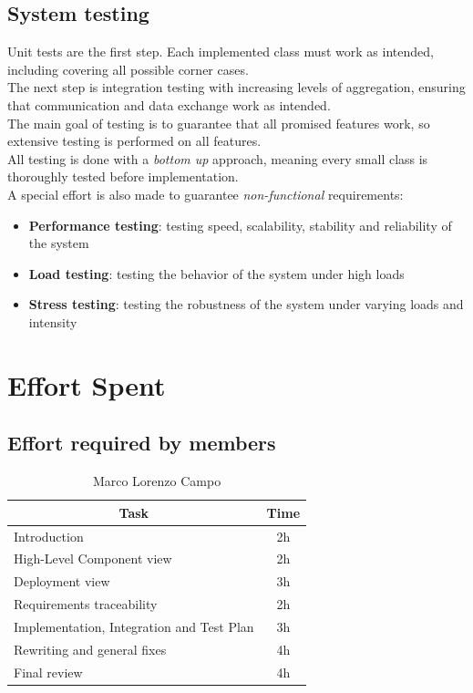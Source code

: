 \documentclass[12pt]{report}
\begin{document}
\section{System testing}
Unit tests are the first step. Each implemented class must work as intended, including covering all possible corner cases.\\
The next step is integration testing with increasing levels of aggregation, ensuring that communication and data exchange work as intended.\\
The main goal of testing is to guarantee that all promised features work, so extensive testing is performed on all features.\\
All testing is done with a \emph{bottom up} approach, meaning every small class is thoroughly tested before implementation.\\
A special effort is also made to guarantee \emph{non-functional} requirements:
\begin{itemize}
    \item\textbf{Performance testing}: testing speed, scalability, stability and reliability of the system
    \item\textbf{Load testing}: testing the behavior of the system under high loads
    \item\textbf{Stress testing}: testing the robustness of the system under
    varying loads and intensity
\end{itemize}

\chapter{Effort Spent}

\section{Effort required by members}
\begin{table}[h]
\centering
\begin{tabular}{|l|c|}
\hline
\multicolumn{1}{|c|}{Task}      & Time \\ \hline
Introduction                    & 2h    \\ \hline
High-Level Component view       & 2h    \\ \hline
Deployment view                 & 3h    \\ \hline
Requirements traceability       & 2h    \\ \hline
Implementation, Integration and Test Plan     & 3h    \\ \hline
Rewriting and general fixes & 4h \\ \hline
Final review & 4h \\ \hline
\end{tabular}
\caption{Marco Lorenzo Campo}
\label{tab:my-table11}
\end{table}
\end{document}
